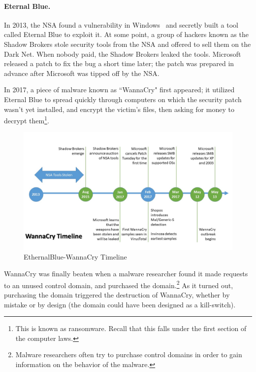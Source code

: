 \paragraph{Eternal Blue.} In 2013, the NSA found a vulnerability in
Windows~\cite{CVE-2017-0144} and secretly built a tool called Eternal Blue to
exploit it. At some point, a group of hackers known as the Shadow Brokers stole
security tools from the NSA and offered to sell them on the Dark Net. When
nobody paid, the Shadow Brokers leaked the tools. Microsoft released a patch to
fix the bug a short time later; the patch was prepared in advance after
Microsoft was tipped off by the NSA.

In 2017, a piece of malware known as ``WannaCry" first appeared; it utilized
Eternal Blue to spread quickly through computers on which the security patch
wasn't yet installed, and encrypt the victim's files, then asking for money to
decrypt them\footnote{This is known as ransomware. Recall that this falls under
the first section of the computer laws.}.

\begin{figure}[!ht]
    \centering
    \includegraphics[width=\textwidth]{images/EthernalBlue-WannaCry_Timeline.jpg}
    \caption{EthernalBlue-WannaCry Timeline} \label{fig:wannacry_timeline}
\end{figure}

WannaCry was finally beaten when a malware researcher found it made requests to
an unused control domain, and purchased the domain.\footnote{Malware researchers
often try to purchase control domains in order to gain information on the
behavior of the malware.} As it turned out, purchasing the domain triggered the
destruction of WannaCry, whether by mistake or by design (the domain could have
been designed as a kill-switch).

